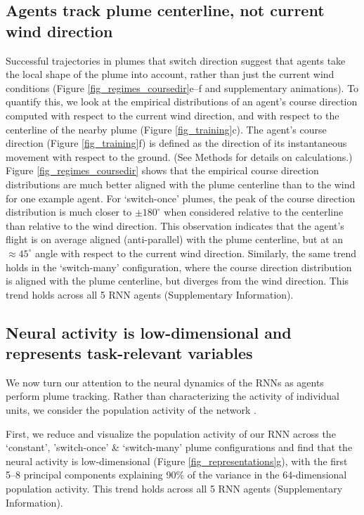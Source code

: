 \documentclass[5p,twocolumn,authoryear]{elsarticle}
\begin{document}
\subsection*{Agents track plume centerline, not current wind direction}
\label{sec_centerline}

Successful trajectories in plumes that switch direction suggest that agents take the local shape of the plume into account, rather than just the current wind conditions (Figure \ref{fig_regimes_coursedir}e--f and supplementary animations).
To quantify this, we look at the empirical distributions of an agent's course direction computed with respect to the current wind direction, and with respect to the centerline of the nearby plume (Figure \ref{fig_training}c).
The agent's course direction (Figure \ref{fig_training}f) is defined as the direction of its instantaneous movement with respect to the ground. 
(See Methods for details on calculations.)
Figure \ref{fig_regimes_coursedir} shows that the empirical course direction distributions are much better aligned with the plume centerline than to the wind for one example agent.
For `switch-once' plumes, the peak of the course direction distribution is much closer to $\pm180^{\circ}$ when considered relative to the centerline than relative to the wind direction.
This observation indicates that the agent's flight is on average aligned (anti-parallel) with the plume centerline, but at an $\approx 45^{\circ}$ angle with respect to the current wind direction.
Similarly, the same trend holds in the `switch-many' configuration, where the course direction distribution is aligned with the plume centerline, but diverges from the wind direction.
This trend holds across all 5 RNN agents (Supplementary Information).

\subsection*{Neural activity is low-dimensional and represents task-relevant variables}
\label{sec_repr}

We now turn our attention to the neural dynamics of the RNNs as agents perform plume tracking.  
Rather than characterizing the activity of individual units, we consider the population activity of the network \citep{ebitz2021population,saxena2019towards}.

First, we reduce and visualize the population activity of our RNN across the `constant', 'switch-once' \& `switch-many' plume configurations and find that the neural activity is low-dimensional (Figure \ref{fig_representations}g), with the first 5--8 principal components explaining 90$\%$ of the variance in the 64-dimensional population activity. 
This trend holds across all 5 RNN agents (Supplementary Information).
\end{document}
